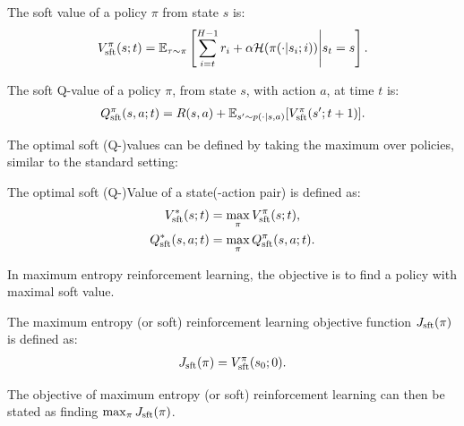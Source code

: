     \begin{defn}
        \label{def:2:sft_value}
        \label{def:2:sft_q_value}
        The \textnormal{soft value} of a policy $\pi$ from state $s$  is:
        \begin{align}
            V_{{\textnormal{sft}}}^{\pi}(s;t) = \mathbb{E}_{\tau\sim\pi}\left[\sum_{i=t}^{H-1} r_i + \alpha\mathcal{H}(\pi(\cdot|s_i;i)) \Bigg| s_t=s \right]. \label{eq:2:sft_value_fn_def}
        \end{align}

        The \textnormal{soft Q-value} of a policy $\pi$, from state $s$, with action $a$, at time $t$ is:
        \begin{align}
            Q_{{\textnormal{sft}}}^{\pi}(s,a;t) = R(s,a) + \mathbb{E}_{s'\sim p(\cdot|s,a)} [V_{{\textnormal{sft}}}^{\pi}(s';t+1)]. \label{eq:2:sft_q_value_fn_def}
        \end{align} 
    \end{defn}

    The optimal soft (Q-)values can be defined by taking the maximum over policies, similar to the standard setting:
    \begin{defn}
        \label{def:2:optimal_sft_value}
        \label{def:2:optimal_sft_q_value}
        The \textnormal{optimal soft (Q-)Value} of a state(-action pair) is defined as:
        \begin{align}
            V_{{\textnormal{sft}}}^*(s;t) &= \max_{\pi} V_{{\textnormal{sft}}}^{\pi}(s;t), \label{eq:2:opt_soft_value_fn_def} \\
            Q_{{\textnormal{sft}}}^*(s,a;t) &= \max_{\pi} Q_{{\textnormal{sft}}}^{\pi}(s,a;t). \label{eq:2:opt_soft_q_value_fn_def}
        \end{align}
    \end{defn}

    In maximum entropy reinforcement learning, the objective is to find a policy with maximal soft value.
    \begin{defn}
        \label{def:2:soft_rl_obj_fn}
        The \textnormal{maximum entropy (or soft) reinforcement learning objective function} $J_{{\textnormal{sft}}}(\pi)$ is defined as:
        \begin{align}
            J_{{\textnormal{sft}}}(\pi) = V_{{\textnormal{sft}}}^{\pi}(s_0;0). \label{eq:2:soft_rl_obj_fn_def}
        \end{align}

        The objective of maximum entropy (or soft) reinforcement learning can then be stated as finding $\max_{\pi} J_{{\textnormal{sft}}}(\pi)$.
    \end{defn}

